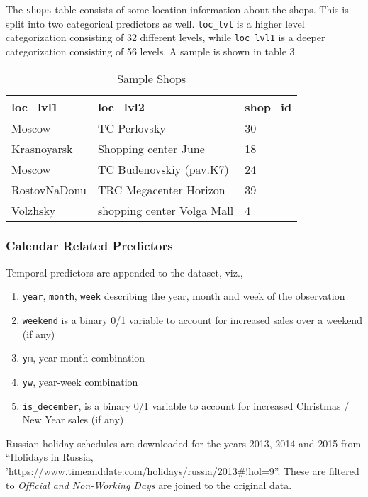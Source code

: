 \documentclass[floatsintext,man]{apa6}
\providecommand{\tightlist}{%
  \setlength{\itemsep}{0pt}\setlength{\parskip}{0pt}}
\theoremstyle{definition}
\theoremstyle{definition}
\theoremstyle{definition}
\theoremstyle{remark}
\begin{document}
The \texttt{shops} table consists of some location information about the
shops. This is split into two categorical predictors as well.
\texttt{loc\_lvl} is a higher level categorization consisting of 32
different levels, while \texttt{loc\_lvl1} is a deeper categorization
consisting of 56 levels. A sample is shown in table 3.

\begin{table}[H]

\caption{\label{tab:unnamed-chunk-3}Sample Shops}
\centering
\fontsize{11}{13}\selectfont
\begin{tabular}[t]{lll}
\toprule
loc\_lvl1 & loc\_lvl2 & shop\_id\\
\midrule
Moscow & TC Perlovsky & 30\\
Krasnoyarsk & Shopping center June & 18\\
Moscow & TC Budenovskiy (pav.K7) & 24\\
RostovNaDonu & TRC Megacenter Horizon & 39\\
Volzhsky & shopping center Volga Mall & 4\\
\bottomrule
\end{tabular}
\end{table}

\subsubsection{Calendar Related
Predictors}\label{calendar-related-predictors}

Temporal predictors are appended to the dataset, viz.,

\begin{enumerate}
\def\labelenumi{\arabic{enumi}.}
\tightlist
\item
  \texttt{year}, \texttt{month}, \texttt{week} describing the year,
  month and week of the observation
\item
  \texttt{weekend} is a binary 0/1 variable to account for increased
  sales over a weekend (if any)
\item
  \texttt{ym}, year-month combination
\item
  \texttt{yw}, year-week combination
\item
  \texttt{is\_december}, is a binary 0/1 variable to account for
  increased Christmas / New Year sales (if any)
\end{enumerate}

Russian holiday schedules are downloaded for the years 2013, 2014 and
2015 from \enquote{Holidays in Russia,
'\url{https://www.timeanddate.com/holidays/russia/2013\#!hol=9}}. These
are filtered to \emph{Official and Non-Working Days} are joined to the
original data.
\end{document}
